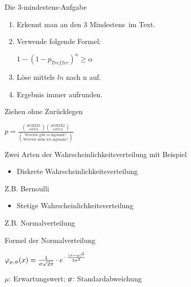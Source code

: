 \documentclass[paper=a6,landscape,ngerman,twoside=true,fontsize=12pt]{scrartcl}
\begin{document}
\begin{frage}
	Die 3-mindestens-Aufgabe
	
\end{frage}
\begin{antwort}
	\begin{enumerate}
		\item Erkennt man an den 3 \glqq Mindestens\grqq~im Text. 
		\item Verwende folgende Formel:
		
		 $1-(1-p_{Treffer})^n\geq \alpha$
		\item Löse mittels $ln$ nach  n auf.
		\item Ergebnis immer aufrunden.
	\end{enumerate}
	
\end{antwort}
\begin{frage}
	Ziehen ohne Zurücklegen
	
\end{frage}
\begin{antwort}
	\LARGE
	 $p=\frac{\binom{SORTE1}{sorte1}\binom{SORTE2}{sorte2}}{\binom{\text{Wieviele gibt es ingesamt?}}{\text{Wieviele ziehe ich ingesamt?}}}$
	
\end{antwort}
\begin{frage}
	Zwei Arten der Wahrscheinlichkeitsverteilung mit Beispiel
	
\end{frage}
\begin{antwort}
	\begin{itemize}
		\item Diskrete Wahrscheinlichkeitsverteilung
	\end{itemize}
	Z.B. Bernoulli
	\begin{itemize}
		\item Stetige Wahrscheinlichkeitsverteilung
	\end{itemize}
	Z.B. Normalverteilung
\end{antwort}	
\begin{frage}
	Formel der Normalverteilung
\end{frage}
\begin{antwort}
	\begin{center}
		$\huge\varphi_{\mu,\std}(x)=\frac{1}{\std\sqrt{2\pi}}\cdot e^{-\frac{(x-\mu)^2}{2\std^2}}$
		\vspace{1cm}
		
		$\mu$: Erwartungswert; $\upsigma$: Standardabweichung
	\end{center}
\end{antwort}	
\end{document}
